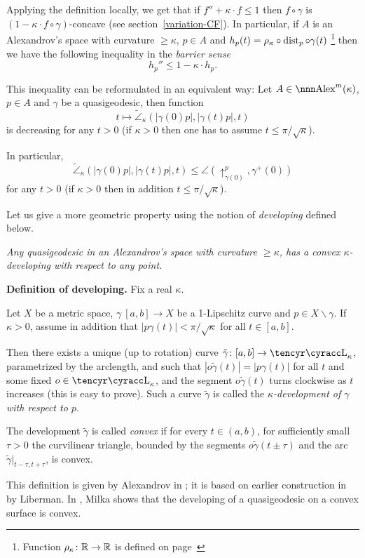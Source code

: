 \documentclass{article}
\begin{document}
Applying the definition locally, 
we get that if $f''+\kappa{\cdot}f\le 1$ then $f\circ\gamma$ is $(1-\kappa{\cdot}f\circ\gamma)$-concave (see section~\ref{variation-CF}). 
In particular, if $A$ is an Alexandrov's space with curvature $\ge\kappa$, $p\in
A$ and $h_p(t)=\rho_\kappa\circ\operatorname{dist}_p\circ\gamma(t)$%
\footnote{Function
$\rho_\kappa\colon\mathbb{R}\to\mathbb{R}$ is defined on page~\pageref{rho_k}} 
then we have the
following inequality in the \emph{barrier sense}
$$h_p''\le 1- \kappa{\cdot} h_p.$$

This inequality can be reformulated in an equivalent way:
Let $A\in \Alex^m(\kappa)$, $p\in A$ and $\gamma$ be a quasigeodesic, then
function
$$t\mapsto \tilde\angle_\kappa(|\gamma(0)p|,|\gamma(t)p|,t)$$
is decreasing for any $t>0$ (if $\kappa>0$ then one has to assume
$t\le\pi/\sqrt\kappa$).

In particular, 
$$
\tilde\angle_\kappa(|\gamma(0)p|,|\gamma(t)p|,t)\le\angle(\uparrow_{\gamma(0)}^p,\gamma^+(0))$$ 
for any $t>0$ (if $\kappa>0$ then in addition $t\le\pi/\sqrt\kappa$).

Let us give a more geometric property using the notion of {\it developing} defined below. 

{\it Any quasigeodesic in an Alexandrov's space with curvature $\ge \kappa$, has a
convex $\kappa$-developing with respect to any point.}


\begin{thm}{\bf Definition of developing.} 
Fix a real $\kappa$. 

Let $X$ be a metric space, $\gamma\:[a,b]\to X$ be a 1-Lipschitz curve and $p\in
X\backslash\gamma$. 
If $\kappa>0$, assume in addition that $|p\gamma(t)| < \pi/ \sqrt{\kappa}$ for
all 
$t\in [a,b]$. 

Then there exists a unique (up to rotation) curve
$\tilde\gamma\: [a,b]\to \Lob_\kappa$, parametrized by the arclength, and such
that
$|o\tilde\gamma(t)|=|p\gamma(t)|$ for all $t$ and some fixed $o\in \Lob_\kappa$,
and the segment
$o\tilde\gamma(t)$ turns clockwise as $t$ increases
(this is easy to prove).
Such a curve $\tilde\gamma$ is called the \emph{$\kappa$-development of $\gamma$
with respect to $p$}. 

The development $\tilde\gamma$ is called \emph{convex} if for every $t\in
(a,b)$, for sufficiently small $\tau > 0$ the
curvilinear triangle, bounded by the segments $o\tilde\gamma(t\pm\tau)$ and the
arc $\tilde\gamma|_{t-\tau,t+\tau}$, is convex. 
\end{thm}

This definition is given by Alexandrov in \cite{alexandrov:devel};
it is based on earlier construction in \cite{liberman} by Liberman.
In \cite{milka:qg}, Milka shows that the developing of a quasigeodesic on a convex surface is convex.
\end{document}
